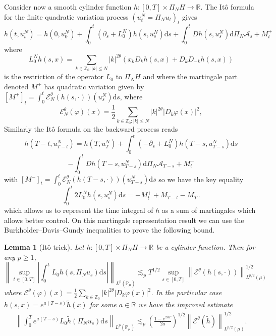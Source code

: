 \documentclass[11pt,a4paper,reqno]{amsart}
\newtheorem{lemma}{Lemma}
\newcommand{\PP}{\mathbb{P}}
\newcommand{\RR}{\mathbb{R}}
\newcommand{\ZZ}{\mathbb{Z}}
\newcommand{\cE}{\mathcal{E}}
\newcommand{\dd}{\mathrm{d}}
\newcommand{\cA}{\mathcal{A}}
\begin{document}
Consider now a smooth cylinder function  $h:[0,T]\times \Pi_N H\to \RR$. The It\^o formula for the finite quadratic variation process $(u^N_t = \Pi_N u_t)_t$ gives
$$
h(t,u^N_t)=h(0,u^N_0)+\int_0^t (\partial_s + L^N_0) h(s,u^N_s) \dd s +\int_0^t D h(s,u^N_s) \dd\Pi_N \cA_s + M^+_t 
$$ 
where 
$$
L^N_0 h(s,x) = \sum_{k\in\ZZ_0 : |k|\le N} |k|^{2\theta} ( x_{k} D_k h(s,x) + D_k D_{-k} h(s,x))
$$
is the restriction of the operator $L_0$ to $\Pi_N H$ and where
the martingale part denoted $M^+$ has quadratic variation given by
$
[ M^+ ]_t = \int_0^t \cE^\theta_N(h(s,\cdot))(u^N_s) \dd s
$,
where 
$$
\cE_N^\theta(\varphi)(x) = \frac12  \sum_{k\in \ZZ_0: |k|\le N}|k|^{2\theta}  |D_k \varphi(x)|^2 ,
$$
Similarly the It\^o formula on the backward process reads
$$
h(T-t,u^N_{T-t})=h(T,u^N_T)+ \int_0^{t} (-\partial_s + L^N_0) h(T-s,u^N_{T-s}) \dd s
$$
$$
- \int_0^{t} D h(T-s,u^N_{T-s}) \dd \Pi_N \cA_{T-s} + M^-_t 
$$
with $
[ M^- ]_t = \int_0^t \cE^\theta_N(h(T-s,\cdot))(u^N_{T-s}) \dd s
$
so we have the key equality
\begin{equation}
\label{eq:key-representation}
\int_0^t 2 L_0^N   h(s,u^N_{s})\dd s= -M^+_t + M^-_{T-t}-M^-_T. 
\end{equation}
which allows us to represent the time integral of $h$ as a sum of martingales which allows better control. 
On this martingale representation result we can use the Burkholder--Davis--Gundy inequalities to prove the following bound.
\begin{lemma}[It\^o trick] 
\label{lemma:ito-trick}
Let $h : [0,T]\times \Pi_N H \to \RR$ be a cylinder function. Then
for any $p \geq 1$,
\begin{equation}
\label{eq:ito-trick}
\left\|\sup_{t\in[0,T]}\left|\int_0^t L_0 h(s,\Pi_N u_s) \dd s\right|\right\|_{L^p(\PP_\mu)} \lesssim_p 
T^{1/2} \sup_{s\in[0,T]}\left\|  \cE^\theta(h(s,\cdot))  \right\|^{1/2}_{L^{p/2}(\mu)} 
\end{equation}
where
$
\cE^\theta(\varphi)(x) = \frac12  \sum_{k\in \ZZ_0}|k|^{2\theta}  |D_k \varphi(x)|^2 
$.
In the particular case $h(s,x)= e^{a(T- s)}\tilde h(x)$ for some $a\in\RR$  we have the improved estimate
\begin{equation}
\label{eq:ito-trick-conv}
\begin{split}
\left\|\int_0^T e^{a(T-s)} L_0 \tilde h(\Pi_N u_s) \dd s\right\|_{L^p(\PP_\mu)} 
\lesssim_p
 \left(\frac{1-e^{2aT}}{2a}\right)^{1/2} 
 \left\| \cE^\theta(\tilde h) \right\|^{1/2}_{L^{p/2}(\mu)} .
 \end{split}
\end{equation}
\end{lemma}
\end{document}

